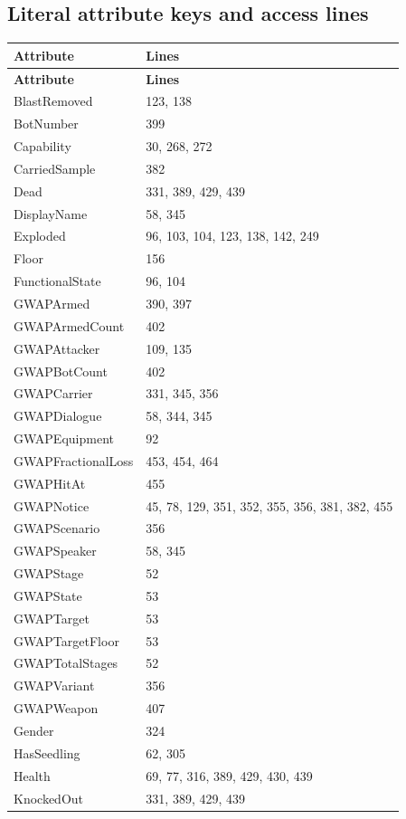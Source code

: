 \subsection{Literal attribute keys and access lines}
\begin{longtable}{p{}p{}}
\toprule
\textbf{Attribute} & \textbf{Lines} \\ \midrule
\endfirsthead
\textbf{Attribute} & \textbf{Lines} \\ \midrule
\endhead
BlastRemoved & 123, 138 \\
BotNumber & 399 \\
Capability & 30, 268, 272 \\
CarriedSample & 382 \\
Dead & 331, 389, 429, 439 \\
DisplayName & 58, 345 \\
Exploded & 96, 103, 104, 123, 138, 142, 249 \\
Floor & 156 \\
FunctionalState & 96, 104 \\
GWAPArmed & 390, 397 \\
GWAPArmedCount & 402 \\
GWAPAttacker & 109, 135 \\
GWAPBotCount & 402 \\
GWAPCarrier & 331, 345, 356 \\
GWAPDialogue & 58, 344, 345 \\
GWAPEquipment & 92 \\
GWAPFractionalLoss & 453, 454, 464 \\
GWAPHitAt & 455 \\
GWAPNotice & 45, 78, 129, 351, 352, 355, 356, 381, 382, 455 \\
GWAPScenario & 356 \\
GWAPSpeaker & 58, 345 \\
GWAPStage & 52 \\
GWAPState & 53 \\
GWAPTarget & 53 \\
GWAPTargetFloor & 53 \\
GWAPTotalStages & 52 \\
GWAPVariant & 356 \\
GWAPWeapon & 407 \\
Gender & 324 \\
HasSeedling & 62, 305 \\
Health & 69, 77, 316, 389, 429, 430, 439 \\
KnockedOut & 331, 389, 429, 439 \\

\end{longtable}
